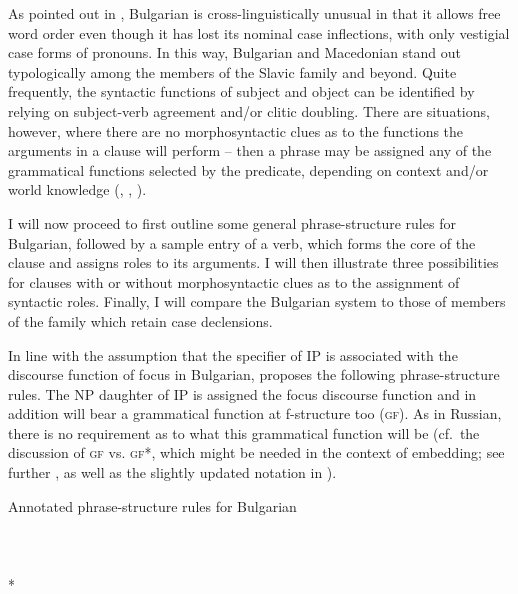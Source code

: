 \documentclass[output=paper,hidelinks]{langscibook}
\begin{document}
As pointed out in , Bulgarian is cross-linguistically unusual in that it allows free word order even though it has lost its nominal case inflections, with only vestigial case forms of pronouns. In this way, Bulgarian and Macedonian stand out typologically among the members of the Slavic family and beyond. Quite frequently, the syntactic functions of subject and object can be identified by relying on subject-verb agreement and/or clitic doubling. There are situations, however, where there are no morphosyntactic clues as to the functions the arguments in a clause will perform -- then a phrase may be assigned any of the grammatical functions selected by the predicate, depending on context and/or world knowledge (\citealt{Rudin1985}, \citealt[133--135]{dalrymple01}, \citealt[184--189]{DLM:LFG}). 

I will now proceed to first outline some general phrase-structure rules for Bulgarian, followed by a sample entry of a verb, which forms the core of the clause and assigns roles to its arguments. I will then illustrate three possibilities for clauses with or without morphosyntactic clues as to the assignment of syntactic roles. Finally, I will compare the Bulgarian system to those of members of the family which retain case declensions.

In line with the assumption that the specifier of IP is associated with the discourse function of focus in Bulgarian, \citet[134]{dalrymple01} proposes the following phrase-structure rules. The NP daughter of IP is assigned the focus discourse function and in addition will bear a grammatical function at f-structure too (\textsc{gf}). As in Russian, there is no requirement as to what this grammatical function will be (cf.\ the discussion of \textsc{gf} vs. \textsc{gf*}, which might be needed in the context of embedding; see further \citealt[esp.\ Chapter 7]{Rudin1985}, as well as the slightly updated notation in \citealt[185]{DLM:LFG}).

\ea\label{ex:Slavic:15} Annotated phrase-structure rules for Bulgarian\\[1ex]
\\[.5ex]
\\[.5ex]
\\[.5ex]
*\\
    \z
\end{document}
